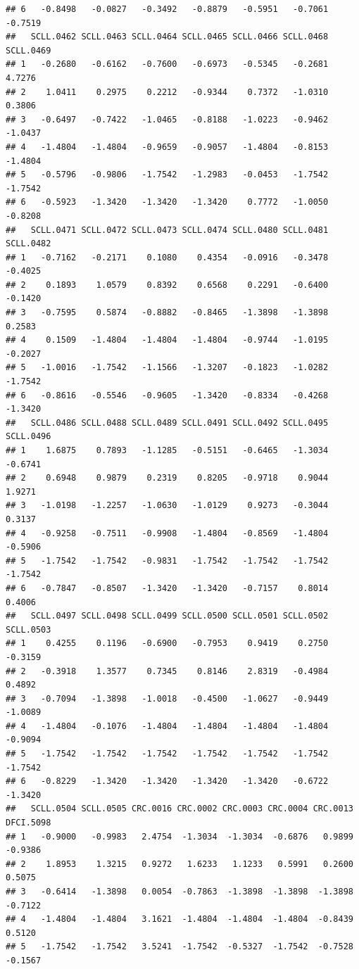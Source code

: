 \documentclass[
]{article}
\begin{document}
\begin{verbatim}
## 6   -0.8498   -0.0827   -0.3492   -0.8879   -0.5951   -0.7061   -0.7519
##   SCLL.0462 SCLL.0463 SCLL.0464 SCLL.0465 SCLL.0466 SCLL.0468 SCLL.0469
## 1   -0.2680   -0.6162   -0.7600   -0.6973   -0.5345   -0.2681    4.7276
## 2    1.0411    0.2975    0.2212   -0.9344    0.7372   -1.0310    0.3806
## 3   -0.6497   -0.7422   -1.0465   -0.8188   -1.0223   -0.9462   -1.0437
## 4   -1.4804   -1.4804   -0.9659   -0.9057   -1.4804   -0.8153   -1.4804
## 5   -0.5796   -0.9806   -1.7542   -1.2983   -0.0453   -1.7542   -1.7542
## 6   -0.5923   -1.3420   -1.3420   -1.3420    0.7772   -1.0050   -0.8208
##   SCLL.0471 SCLL.0472 SCLL.0473 SCLL.0474 SCLL.0480 SCLL.0481 SCLL.0482
## 1   -0.7162   -0.2171    0.1080    0.4354   -0.0916   -0.3478   -0.4025
## 2    0.1893    1.0579    0.8392    0.6568    0.2291   -0.6400   -0.1420
## 3   -0.7595    0.5874   -0.8882   -0.8465   -1.3898   -1.3898    0.2583
## 4    0.1509   -1.4804   -1.4804   -1.4804   -0.9744   -1.0195   -0.2027
## 5   -1.0016   -1.7542   -1.1566   -1.3207   -0.1823   -1.0282   -1.7542
## 6   -0.8616   -0.5546   -0.9605   -1.3420   -0.8334   -0.4268   -1.3420
##   SCLL.0486 SCLL.0488 SCLL.0489 SCLL.0491 SCLL.0492 SCLL.0495 SCLL.0496
## 1    1.6875    0.7893   -1.1285   -0.5151   -0.6465   -1.3034   -0.6741
## 2    0.6948    0.9879    0.2319    0.8205   -0.9718    0.9044    1.9271
## 3   -1.0198   -1.2257   -1.0630   -1.0129    0.9273   -0.3044    0.3137
## 4   -0.9258   -0.7511   -0.9908   -1.4804   -0.8569   -1.4804   -0.5906
## 5   -1.7542   -1.7542   -0.9831   -1.7542   -1.7542   -1.7542   -1.7542
## 6   -0.7847   -0.8507   -1.3420   -1.3420   -0.7157    0.8014    0.4006
##   SCLL.0497 SCLL.0498 SCLL.0499 SCLL.0500 SCLL.0501 SCLL.0502 SCLL.0503
## 1    0.4255    0.1196   -0.6900   -0.7953    0.9419    0.2750   -0.3159
## 2   -0.3918    1.3577    0.7345    0.8146    2.8319   -0.4984    0.4892
## 3   -0.7094   -1.3898   -1.0018   -0.4500   -1.0627   -0.9449   -1.0089
## 4   -1.4804   -0.1076   -1.4804   -1.4804   -1.4804   -1.4804   -0.9094
## 5   -1.7542   -1.7542   -1.7542   -1.7542   -1.7542   -1.7542   -1.7542
## 6   -0.8229   -1.3420   -1.3420   -1.3420   -1.3420   -0.6722   -1.3420
##   SCLL.0504 SCLL.0505 CRC.0016 CRC.0002 CRC.0003 CRC.0004 CRC.0013 DFCI.5098
## 1   -0.9000   -0.9983   2.4754  -1.3034  -1.3034  -0.6876   0.9899   -0.9386
## 2    1.8953    1.3215   0.9272   1.6233   1.1233   0.5991   0.2600    0.5075
## 3   -0.6414   -1.3898   0.0054  -0.7863  -1.3898  -1.3898  -1.3898   -0.7122
## 4   -1.4804   -1.4804   3.1621  -1.4804  -1.4804  -1.4804  -0.8439    0.5120
## 5   -1.7542   -1.7542   3.5241  -1.7542  -0.5327  -1.7542  -0.7528   -0.1567

\end{verbatim}
\end{document}
